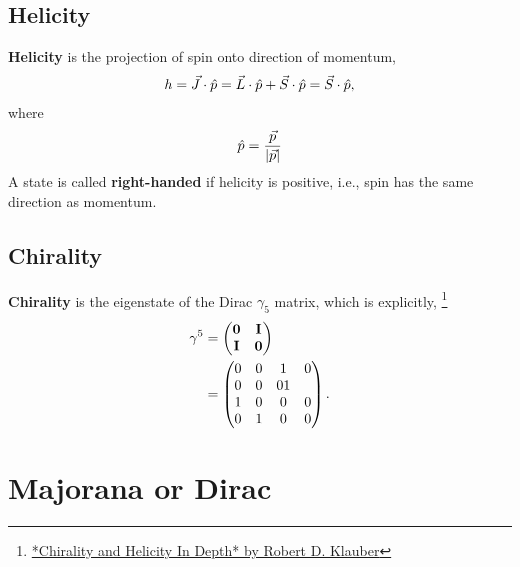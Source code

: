 \documentclass[letterpaper,12pt,english]{sphinxmanual}
\begin{document}
\subsection{Helicity}
\label{preliminary:index-0}\label{preliminary:helicity}
\textbf{Helicity} is the projection of spin onto direction of momentum,
\begin{gather}
\begin{split}h = \vec J\cdot\hat p = \vec L\cdot\hat p + \vec S\cdot \hat p = \vec S\cdot \hat p,\end{split}\notag
\end{gather}
where
\begin{gather}
\begin{split}\hat p = \frac{\vec p}{\left|\vec p\right|}\end{split}\notag
\end{gather}
A state is called \textbf{right-handed} if helicity is positive, i.e., spin has the same direction as momentum.


\subsection{Chirality}
\label{preliminary:chirality}\label{preliminary:index-1}
\textbf{Chirality} is the eigenstate of the Dirac \(\gamma_5\) matrix, which is explicitly, \footnote[1]{
\href{http://www.quantumfieldtheory.info/ChiralityandHelicityindepth.htm}{*Chirality and Helicity In Depth* by Robert D. Klauber}
}
\begin{gather}
\begin{split}\gamma^5 &= \begin{pmatrix} \mathbf 0 & \mathbf I \\ \mathbf I & \mathbf 0 \end{pmatrix} \\
& = \begin{pmatrix} 0 & 0 & 1 & 0 \\ 0 & 0 & 0 1 \\ 1 & 0 & 0 & 0 \\ 0 & 1 & 0 & 0  \end{pmatrix}.\end{split}\notag
\end{gather}

\section{Majorana or Dirac}
\label{preliminary:majorana-or-dirac}
\end{document}
